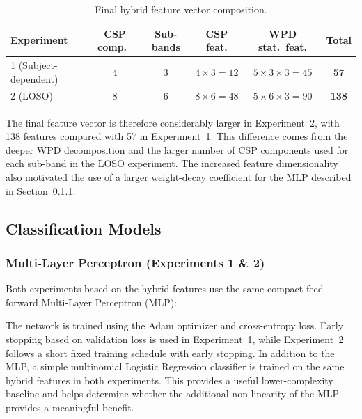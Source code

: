 \documentclass[11pt,a4paper]{article}
\begin{document}
	\begin{table}[H]
		\centering
		\caption{Final hybrid feature vector composition.}
		\label{tab:feature-vector}
		\begin{tabular}{lccccc}
			\toprule
			Experiment & CSP comp.\ & Sub-bands & CSP feat. & WPD stat.\ feat. & \textbf{Total} \\
			\midrule
			1 (Subject-dependent) & 4 & 3 & $4\times3=12$ & $5\times3\times3=45$ & \textbf{57} \\
			2 (LOSO)               & 8 & 6 & $8\times6=48$ & $5\times6\times3=90$ & \textbf{138} \\
			\bottomrule
		\end{tabular}
	\end{table}
	
	The final feature vector is therefore considerably larger in Experiment~2, with 138 features
	compared with 57 in Experiment~1. This difference comes from the deeper WPD decomposition and
	the larger number of CSP components used for each sub-band in the LOSO experiment. The increased
	feature dimensionality also motivated the use of a larger weight-decay coefficient for the MLP
	described in Section~\ref{sec:mlp}.
	
\subsection{Classification Models}

\subsubsection{Multi-Layer Perceptron (Experiments 1 \& 2)}
\label{sec:mlp}

Both experiments based on the hybrid features use the same compact feed-forward Multi-Layer
Perceptron (MLP):
\begin{center}
\end{center}

The network is trained using the Adam optimizer and cross-entropy loss. Early stopping based on
validation loss is used in Experiment~1, while Experiment~2 follows a short fixed training schedule
with early stopping. In addition to the MLP, a simple multinomial Logistic Regression classifier
is trained on the same hybrid features in both experiments. This provides a useful lower-complexity
baseline and helps determine whether the additional non-linearity of the MLP provides a meaningful
benefit.
\end{document}
